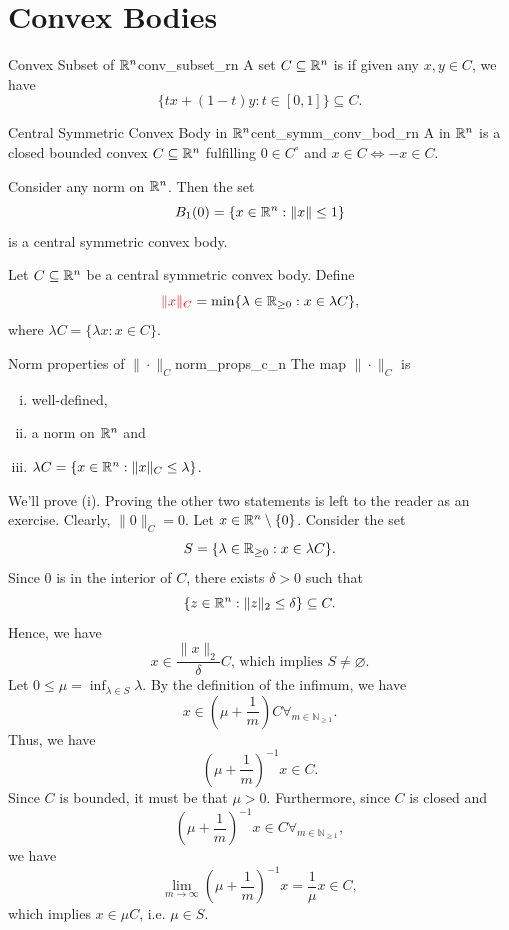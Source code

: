 \documentclass{Vorlesungstemplate_English} %
\renewcommand{\N}{\mathbb{N}_{\geq 1}}
\begin{document}
\section{Convex Bodies}
\begin{definition}{Convex Subset of $\mathbb{R}^n$}{conv_subset_rn}
  A set $C \subseteq \mathbb{R}^n$ is  if given any $x,y \in C$, we have
  \[ \{ tx+(1-t)y: t \in [0,1]\} \subseteq C.\]
\end{definition}
\begin{definition}{Central Symmetric Convex Body in $\mathbb{R}^n$}{cent_symm_conv_bod_rn}
  A  in $\mathbb{R}^n$ is a closed bounded convex $C \subseteq \mathbb{R}^n$ fulfilling $0 \in C^\circ$ and $x \in C \iff -x\in C$.
\end{definition}
\begin{example}
  Consider any norm on $\mathbb{R}^n$. Then the set
  \[ B_1(0) = \{ x \in \mathbb{R}^n: \|x\| \leq 1\}\]
  is a central symmetric convex body.
\end{example}
\noindent Let $C \subseteq \mathbb{R}^n$ be a central symmetric convex body. Define
\[ \index{$C$-norm $\|x\|_C$}{\color{red} \|x\|_C} = \min\{ \lambda \in \R_{\geq 0}: x \in \lambda C\},\]
where $\lambda C = \{ \lambda x: x \in C\}$.
\begin{lemma}{Norm properties of $\|\cdot\|_C$}{norm_props_c_n}
  The map $\|\cdot\|_C$ is
  \begin{enumerate}[(i)]
    \item well-defined,
    \item a norm on $\mathbb{R}^n$ and
    \item $\lambda C = \{ x \in \mathbb{R}^n: \|x\|_C \leq \lambda\}$.
  \end{enumerate}
\end{lemma}
\begin{pf}
  We'll prove (i). Proving the other two statements is left to the reader as an exercise. Clearly, $\|0\|_C = 0$. Let $x \in \mathbb{R}^n \setminus \{ 0\}$. Consider the set
  \[ S = \{ \lambda \in \mathbb{R}_{\geq 0}: x \in \lambda C\}.\]
  Since $0$ is in the interior of $C$, there exists $\delta > 0$ such that
  \[ \{ z \in \mathbb{R}^n: \|z\|_2 \leq \delta\} \subseteq C.\]
  Hence, we have
  \[ x \in \frac{\|x\|_2}{\delta}C \text{, which implies } S \neq \varnothing.\]
  Let $0 \leq \mu = \inf_{\lambda \in S} \lambda$. By the definition of the infimum, we have
  \[ x \in \left(\mu + \frac{1}{m}\right)C \forall_{m \in \N}.\]
  Thus, we have
  \[ \left(\mu + \frac{1}{m}\right)^{-1}x \in C.\]
  Since $C$ is bounded, it must be that $\mu > 0$. Furthermore, since $C$ is closed and
  \[ \left(\mu+\frac{1}{m}\right)^{-1}x \in C \forall_{m \in \N},\]
  we have
  \[ \lim_{m \to \infty}\left(\mu+\frac{1}{m}\right)^{-1}x = \frac{1}{\mu}x \in C,\]
  which implies $x \in \mu C$, i.e. $\mu \in S$.
  \end{pf}
\end{document}

